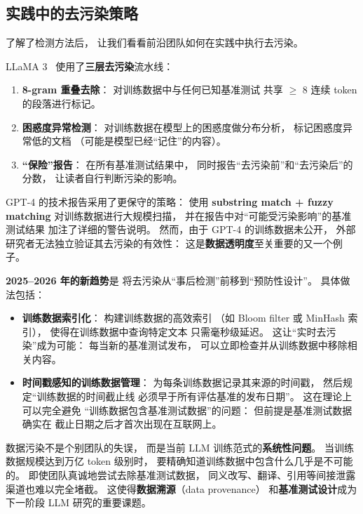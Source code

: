\subsection{实践中的去污染策略}

了解了检测方法后，
让我们看看前沿团队如何在实践中执行去污染。

LLaMA 3~\cite{dubey2024llama3} 使用了\textbf{三层去污染}流水线：
\begin{enumerate}[noitemsep]
  \item \textbf{8-gram 重叠去除}：
        对训练数据中与任何已知基准测试
        共享 $\geq$ 8 连续 token 的段落进行标记。
  \item \textbf{困惑度异常检测}：
        对训练数据在模型上的困惑度做分布分析，
        标记困惑度异常低的文档
        （可能是模型已经“记住”的内容）。
  \item \textbf{“保险”报告}：
        在所有基准测试结果中，
        同时报告“去污染前”和“去污染后”的分数，
        让读者自行判断污染的影响。
\end{enumerate}

GPT-4 的技术报告采用了更保守的策略：
使用 \textbf{substring match + fuzzy matching}
对训练数据进行大规模扫描，
并在报告中对“可能受污染影响”的基准测试结果
加注了详细的警告说明。
然而，由于 GPT-4 的训练数据未公开，
外部研究者无法独立验证其去污染的有效性：
这是\textbf{数据透明度}至关重要的又一个例子。

\textbf{2025--2026 年的新趋势}是
将去污染从“事后检测”前移到“预防性设计”。
具体做法包括：
\begin{itemize}[noitemsep]
  \item \textbf{训练数据索引化}：
        构建训练数据的高效索引
        （如 Bloom filter 或 MinHash 索引），
        使得在训练数据中查询特定文本
        只需毫秒级延迟。
        这让“实时去污染”成为可能：
        每当新的基准测试发布，
        可以立即检查并从训练数据中移除相关内容。
  \item \textbf{时间戳感知的训练数据管理}：
        为每条训练数据记录其来源的时间戳，
        然后规定“训练数据的时间截止线
        必须早于所有评估基准的发布日期”。
        这在理论上可以完全避免
        “训练数据包含基准测试数据”的问题：
        但前提是基准测试数据确实在
        截止日期之后才首次出现在互联网上。
\end{itemize}

\begin{warnbox}[数据污染是一个系统性问题]
数据污染不是个别团队的失误，
而是当前 LLM 训练范式的\textbf{系统性问题}。
当训练数据规模达到万亿 token 级别时，
要精确知道训练数据中包含什么几乎是不可能的。
即使团队真诚地尝试去除基准测试数据，
同义改写、翻译、引用等间接泄露渠道也难以完全堵截。
这使得\textbf{数据溯源}（data provenance）
和\textbf{基准测试设计}成为下一阶段 LLM 研究的重要课题。
\end{warnbox}

